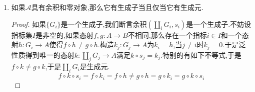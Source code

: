 \begin{enumerate}
\begin{proof}
    	给定对象$A$,对任意单态射$s:B\to A$,定义$\alpha(s)$是$\coprod_i\mathscr{A}(G_i,A)$的子集:
    	$$\alpha(s)=\{(i,g)\mid i\in I,g\in\mathscr{A}(G_i,A),\exists h\in\mathscr{A}(G_i,B),s\circ h=g\}$$
    	
    	我们来证明两个单态射$r:C\to A$和$s:B\to A$等价当且仅当$\alpha(r)=\alpha(s)$.这导致得到$A$的子对象类到$\coprod_i\mathscr{A}(G_i,A)$幂集的单射,于是导致子对象类构成集合.如果$r,s$是等价的,明显的有$\alpha(r)=\alpha(s)$:
    	$$\xymatrix{&C\ar@/^1pc/[ddr]^{r}\ar[d]\ar@/_1pc/[ddl]_h'&\\&B\ar[u]\ar[dr]^s\ar[dl]_h&\\G_i\ar[rr]_g&&A}$$
    	
    	反过来如果$\alpha(r)=\alpha(s)$,考虑$r,s$的纤维积记作$(B\cap C,u,v)$.任取态射$x:G_i\to B$,那么$r\circ x$有经$r$分解,所以$(i,r\circ x)\in\alpha(r)=\alpha(s)$,所以$r\circ x$要经$s$分解,也即有$y:G_i\to C$使得图表交换,那么按照纤维积的泛性质就有$z:G_i\to B\cap C$使得图表交换.于是我们证明了$\mathscr{A}(G_i,u)$是满射,但是$u$本身是单态射,所以$\mathscr{A}(G_i,u)$也是单射,所以$\mathscr{A}(G_i,u),\forall i$是集合上的双射.但是我们证明过有限完备条件下强生成子等价于对应的这族可表函子是集体反映同构的,所以$u$本身是同构.同理$v$本身也是同构,于是有$r,s$是等价的单态射.
    	$$\xymatrix{G_i\ar@/^1pc/[drrrr]^y\ar[drr]^z\ar@/_1pc/[ddrr]_x&&&&\\&&B\cap C\ar[rr]^v\ar[d]_u&&B\ar[d]^s\\&&C\ar[rr]_r&&A}$$
    \end{proof}
    \item 如果$\mathscr{A}$具有余积和零对象,那么它有生成子当且仅当它有生成元.
    \begin{proof}
    	
    	如果$\{G_i\}$是一个生成子,我们断言余积$(\coprod_iG_i,s_i)$是一个生成子.不妨设指标集$I$是非空的,如果态射$f,g:A\to B$不相同,那么存在一个指标$i\in I$和一个态射$h:G_i\to A$使得$f\circ h\not=g\circ h$.构造$k_j:G_j\to A$为$k_i=h$,当$j\not=i$时$k_j=0$.于是泛性质得到唯一的态射$k:\coprod_jG_j\to A$满足$k\circ s_j=k_j$.特别的有如下不等式,于是$f\circ k\not=g\circ k$,于是$\coprod_iG_i$是生成元.
    	$$f\circ k\circ s_i=f\circ k_i=f\circ h\not=g\circ h=g\circ k_i=g\circ k\circ s_i$$
    \end{proof}
\end{enumerate}

